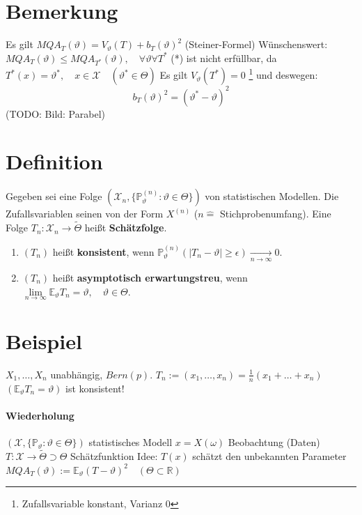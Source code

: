 \documentclass[a4paper,11pt,notitlepage]{report}
\newcommand{\R}{{\ensuremath{\mathbb{R}}}}
\newcommand{\Prim}{{\ensuremath{\mathbb{P}}}}
\newcommand{\E}{{\ensuremath{\mathbb{E}}}}
\begin{document}
\section{Bemerkung}
Es gilt $MQA_T(\vartheta) = V_\vartheta(T) + b_T(\vartheta)^2$ (Steiner-Formel)
\newline
Wünschenswert: $MQA_T(\vartheta) \leq MQA_{T^*}(\vartheta), \quad \forall \vartheta \forall T^*$
\newline
(*) ist nicht erfüllbar, da $T^*(x) = \vartheta^*, \quad x \in \mathcal{X} \quad (\vartheta^* \in \Theta)$
\newline
Es gilt $V_\vartheta (T^*) = 0$ \footnote{Zufallsvariable konstant, Varianz 0} und deswegen:
$$b_T(\vartheta)^2 = (\vartheta^* - \vartheta)^2$$ (TODO: Bild: Parabel)

\section{Definition}

Gegeben sei eine Folge $(\mathcal{X}_n, \{\Prim^{(n)}_\vartheta \colon \vartheta \in \Theta\})$ von statistischen Modellen. Die Zufallsvariablen seinen von der Form $X^{(n)}$ ($n \hat{=}$ Stichprobenumfang).
\newline
Eine Folge $T_n \colon \mathcal{X}_n \rightarrow \widetilde{\Theta}$ heißt \textbf{Schätzfolge}.

\begin{enumerate}
	\item $(T_n)$ heißt \textbf{konsistent}, wenn $\Prim_\vartheta^{(n)} (|T_n - \vartheta| \geq \epsilon) \underset{n \rightarrow \infty}{\rightarrow} 0$.
	\item $(T_n)$ heißt \textbf{asymptotisch erwartungstreu}, wenn $\lim\limits_{n \rightarrow \infty}{\E_\vartheta T_n = \vartheta, \quad \vartheta \in \Theta}$.
\end{enumerate}

\section{Beispiel}
$X_1, \ldots, X_n$ unabhängig, $Bern(p)$.
$T_n := (x_1, \ldots, x_n) = \frac{1}{n} (x_1 + \ldots + x_n)$
$(\E_\vartheta T_n = \vartheta)$ ist konsistent!


\paragraph{Wiederholung}
$(\mathcal{X}, \{ \Prim_\vartheta \colon \vartheta \in \Theta \})$ statistisches Modell
\newline
$x = X(\omega)$ Beobachtung (Daten)
\newline
$T \colon \mathcal{X} \rightarrow \widetilde{\Theta} \supset \Theta$ Schätzfunktion
\newline
Idee: $T(x)$ schätzt den unbekannten Parameter 
\newline
$MQA_T(\vartheta) := \E_\vartheta (T- \vartheta)^2 \quad (\Theta \subset \R)$
\end{document}
